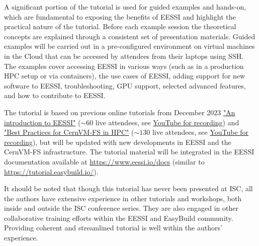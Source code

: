 A significant portion of the tutorial is used for guided examples and hands-on,
which are fundamental to exposing the benefits of EESSI and highlight the practical nature of the tutorial.
Before each example session the theoretical concepts are explained through a consistent set of presentation materials.
Guided examples will be carried out in a pre-configured environment on virtual machines in the Cloud that can be
accessed by
attendees from their laptops using SSH. 
The examples cover accessing EESSI in various ways (such as in a production HPC setup or via
containers), the use cases of EESSI, adding support for new software to EESSI, troubleshooting, GPU support, selected
advanced features, and how to contribute to EESSI.

The tutorial is based on previous online tutorials from December 2023
\href{https://raw.githubusercontent.com/eessi/docs/main/talks/20231205-Introduction-to-EESSI-CASTIEL2/20231205-Introduction-to-EESSI-CASTIEL2.pdf}{"An introduction to EESSI"} ($\sim60$ live attendees, see \href{https://www.youtube.com/watch?v=KAYI9oKFLxA}{YouTube for recording}) and
\href{https://raw.githubusercontent.com/multixscale/cvmfs-tutorial-hpc-best-practices/main/files/Best-Practices-for-CernVM-FS-in-HPC-20231204.pdf}{"Best Practices for CernVM-FS in HPC"} ($\sim130$ live attendees, see \href{https://www.youtube.com/watch?v=L0Mmy7NBXDU}{YouTube for recording}),
but will be updated with new developments in EESSI and the CernVM-FS infrastructure.
The tutorial material will be integrated in the EESSI documentation available at
\href{https://www.eessi.io/docs}{https://www.eessi.io/docs} (similar to \href{https://tutorial.easybuild.io/}{https://tutorial.easybuild.io/}).

It should be noted that though this tutorial has never been presented at ISC, all the authors have extensive
experience in other tutorials and workshops, both inside and outside the ISC conference series.
They are also engaged in other collaborative training efforts within the EESSI and EasyBuild community. Providing coherent and streamlined
tutorial is well within the authors' experience.



